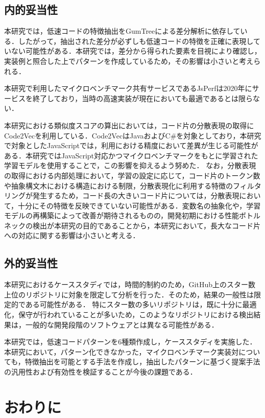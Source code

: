 \documentclass[11pt]{jreport}
\begin{document}
\section{内的妥当性}

本研究では，低速コードの特徴抽出をGumTreeによる差分解析に依存している．したがって，抽出された差分が必ずしも低速コードの特徴を正確に表現していない可能性がある．本研究では，差分から得られた要素を目視により確認し，実装例と照合した上でパターンを作成しているため，その影響は小さいと考えられる．

本研究で利用したマイクロベンチマーク共有サービスであるJsPerfは2020年にサービスを終了しており，当時の高速実装が現在においても最適であるとは限らない．

本研究における類似度スコアの算出においては，コード片の分散表現の取得にCode2Vecを利用している．Code2VecはJavaおよびC\#を対象としており，本研究で対象としたJavaScriptでは，利用における精度において差異が生じる可能性がある．本研究ではJavaScript対応かつマイクロベンチマークをもとに学習された学習モデルを使用することで，この影響を抑えるよう努めた．
なお，分散表現の取得における内部処理において，学習の設定に応じて，コード片のトークン数や抽象構文木における構造における制限，分散表現化に利用する特徴のフィルタリングが発生するため，コード長の大きいコード片については，分散表現において，十分にその特徴を反映できていない可能性がある．変数名の抽象化や，学習モデルの再構築によって改善が期待されるものの，開発初期における性能ボトルネックの検出が本研究の目的であることから，本研究において，長大なコード片への対応に関する影響は小さいと考える．


\section{外的妥当性}

本研究におけるケーススタディでは，時間的制約のため，GitHub上のスター数上位のリポジトリに対象を限定して分析を行った．そのため，結果の一般性は限定的である可能性がある．
特にスター数の多いリポジトリは，既に十分に最適化，保守が行われていることが多いため，このようなリポジトリにおける検出結果は，一般的な開発段階のソフトウェアとは異なる可能性がある．

本研究では，低速コードパターンを6種類作成し，ケーススタディを実施した．本研究において，パターン化できなかった，マイクロベンチマーク実装対についても，特徴抽出を可能とする手法を作成し，抽出したパターンに基づく提案手法の汎用性および有効性を検証することが今後の課題である．


\chapter{おわりに}
\label{chap:finish}
\end{document}
